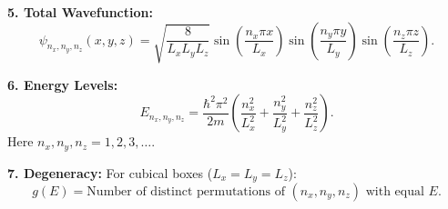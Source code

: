 \documentclass[a4paper,11pt]{article}
\renewcommand{\textbf}[1]{{\scriptsize	\bfseries #1}}
\begin{document}
\begin{footnotesize}
\textbf{5. Total Wavefunction:}
\[
\psi_{n_x, n_y, n_z}(x, y, z) = \sqrt{\frac{8}{L_x L_y L_z}} 
\sin\left(\frac{n_x \pi x}{L_x}\right)
\sin\left(\frac{n_y \pi y}{L_y}\right)
\sin\left(\frac{n_z \pi z}{L_z}\right).
\]

\textbf{6. Energy Levels:}
\[
E_{n_x, n_y, n_z} = \frac{\hbar^2 \pi^2}{2m} 
\left(\frac{n_x^2}{L_x^2} + \frac{n_y^2}{L_y^2} + \frac{n_z^2}{L_z^2}\right).
\]
Here \(n_x, n_y, n_z = 1, 2, 3, \dots\).

\textbf{7. Degeneracy:}
For cubical boxes (\(L_x = L_y = L_z\)):
\[
g(E) = \text{Number of distinct permutations of } (n_x, n_y, n_z) \text{ with equal } E.
\]






\end{footnotesize}
\end{document}
